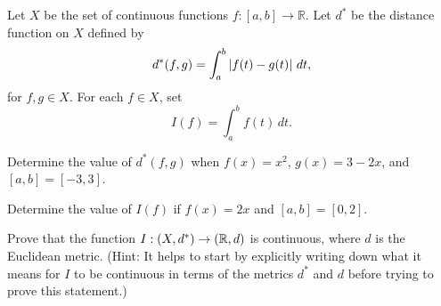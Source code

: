 \begin{comment}

\ExerciseSolution First we demonstrate that $g$ is continuous at $0$. Let $\epsilon$ be a positive real number and let $\delta = \epsilon$. Suppose $x \in \R$ with $|x - 0| = |x| < \delta$. If $x$ is irrational then 
\[|g(x)-g(0)| = |g(x)| = 0 < \epsilon\]
and if $x$ is rational then 
\[|g(x)-g(0)| = |g(x)| = |x| < \delta = \epsilon.\]
Therefore, $g$ is continuous at $0$. 

Now suppose $a \neq 0$. Let $\epsilon < |a|$ and $\delta$ be positive. We consider cases.
\begin{description}
\item[$a$ is irrational:] Let $x$ be a rational number in $(a-\delta, a+\delta)$ with $|x| > |a|$. Then $|x - a| < \delta$ but 
\[|g(x)-g(a)| = |g(x)| = |x| > |a| > \epsilon.\]
So $g$ is not continuous at $a$.
\item[$a$ is rational:] Let $x$ be an irrational number in $(a-\delta, a+\delta)$ with $|x| > |a|$. Then $|x - a| < \delta$ but 
\[|g(x)-g(a)| = |g(a)| = |a| > \epsilon.\]
So $g$ is not continuous at $a$.
\end{description}

\end{comment}

\item Let $X$ be the set of continuous functions $f: [a,b] \to \mathbb{R}$. Let $d^*$ be the distance function on $X$ defined by 
\[d^*(f,g)= \int_a^b \left| f(t)-g(t) \right| \, dt,\]
for $f, g \in X$. For each $f \in X$, set 
\[I(f) = \int_a^b f(t) \, dt.\]

\ba

\item Determine the value of $d^*(f,g)$ when $f(x) = x^2$, $g(x) = 3-2x$, and $[a,b] = [-3,3]$. 

\item Determine the value of $I(f)$ if $f(x) = 2x$ and $[a,b] = [0,2]$. 

\item Prove that the function $I : (X, d^*) \to (\mathbb{R},d)$ is continuous, where $d$ is the Euclidean metric. (Hint: It helps to start by explicitly writing down what it means for $I$ to be continuous in terms of the metrics $d^*$ and $d$ before trying to prove this statement.)

\ea


